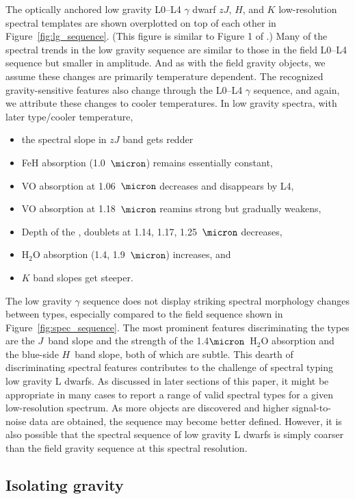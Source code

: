 \documentclass[12pt,preprint]{aastex}
\begin{document}
The optically anchored low gravity L0--L4 $\gamma$ dwarf $zJ$, $H$, and $K$ low-resolution spectral templates are shown overplotted on top of each other in Figure~\ref{fig:lg_sequence}. (This figure is similar to Figure 1 of \cite{Gagne:2015to}.)
Many of the spectral trends in the low gravity sequence are similar to those in the field L0--L4 sequence but smaller in amplitude. And as with the field gravity objects, we assume these changes are primarily temperature dependent. The recognized gravity-sensitive features also change through the L0--L4 $\gamma$ sequence, and again, we attribute these changes to cooler temperatures.
In low gravity spectra, with later type/cooler temperature,
\begin{itemize}
\item the spectral slope in $zJ$ band gets redder 
\item FeH absorption (1.0~$\micron$) remains essentially constant,
\item VO absorption at 1.06~$\micron$ decreases and disappears by L4,
\item VO absorption at 1.18~$\micron$ reamins strong but gradually weakens,
\item Depth of the ,  doublets at 1.14, 1.17, 1.25~$\micron$ decreases, 
\item H$_2$O absorption (1.4, 1.9~$\micron$) increases, and
\item $K$ band slopes get steeper. 
\end{itemize}

The low gravity $\gamma$ sequence does not display striking spectral morphology changes between types, especially compared to the field sequence shown in Figure~\ref{fig:spec_sequence}.
The most prominent features discriminating the types are the $J$~band slope and the strength of the 1.4$\micron$~H$_2$O absorption and the blue-side $H$~band slope, both of which are subtle.
This dearth of discriminating spectral features contributes to the challenge of spectral typing low gravity L dwarfs.
As discussed in later sections of this paper, it might be appropriate in many cases to report a range of valid spectral types for a given low-resolution spectrum.
As more objects are discovered and higher signal-to-noise data are obtained, the sequence may become better defined.
However, it is also possible that the spectral sequence of low gravity L dwarfs is simply coarser than the field gravity sequence at this spectral resolution.

\subsection{Isolating gravity} 
\end{document}
